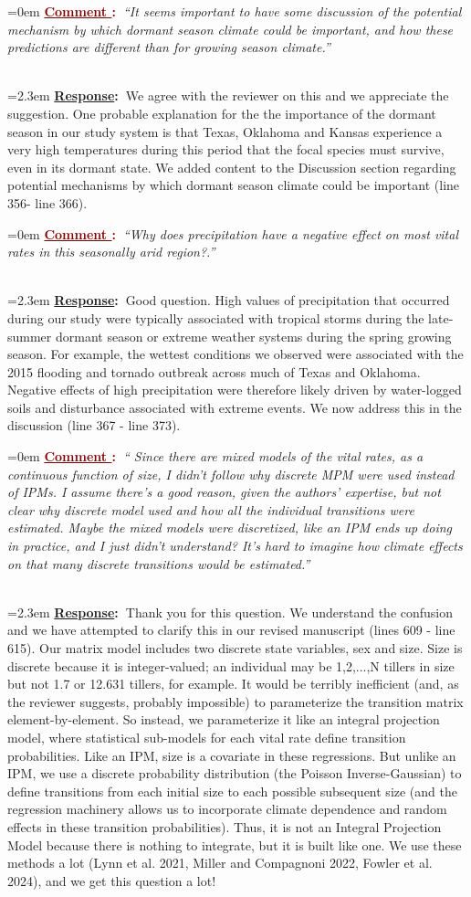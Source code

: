 \documentclass[12pt]{article}
\newcounter{cN}
\newcommand{\comment}[1]{
	\vspace{2em}
	\refstepcounter{cN} %
	\noindent \hangindent=0em \textbf{\textcolor{Maroon}{\uline{Comment \thecN}:~}}\emph{``#1''}
	}
\newcommand{\response}[1]{
	\\[0.25em]
	\hangindent=2.3em \textbf{\textcolor{NavyBlue}{\uline{Response}:~}}#1
	}
\begin{document}
\comment{It seems important to have some discussion of the potential mechanism by which dormant season climate could be important, and how these predictions are different than for growing season climate.}
\response{We agree with the reviewer on this and we appreciate the suggestion.  
One probable explanation for the the importance of the dormant season in our study system is that Texas, Oklahoma and Kansas experience a very high temperatures during this period that the focal species must survive, even in its dormant state.
We added content to the Discussion section regarding potential mechanisms by which dormant season climate could be important (line  356- line 366).}

\comment{Why does precipitation have a negative effect on most vital rates in this seasonally arid region?.}
\response{Good question. High values of precipitation that occurred during our study were typically associated with tropical storms during the late-summer dormant season or extreme weather systems during the spring growing season. 
For example, the wettest conditions we observed were associated with the 2015 flooding and tornado outbreak across much of Texas and Oklahoma. 
Negative effects of high precipitation were therefore likely driven by water-logged soils and disturbance associated with extreme events. 
We now address this in the discussion (line 367 - line 373).
}

\comment{ Since there are mixed models of the vital rates, as a continuous function of size, I didn’t follow why discrete MPM were used instead of IPMs. I assume there’s a good reason, given the authors’ expertise, but not clear why discrete model used and how all the individual transitions were estimated. Maybe the mixed models were discretized, like an IPM ends up doing in practice, and I just didn’t understand? It’s hard to imagine how climate effects on that many discrete transitions would be estimated.}
\response{Thank you for this question. We understand the confusion and we have attempted to clarify this in our revised manuscript (lines 609 - line 615).
Our matrix model includes two discrete state variables, sex and size. 
Size is discrete because it is integer-valued; an individual may be 1,2,...,N tillers in size but not 1.7 or 12.631 tillers, for example. 
It would be terribly inefficient (and, as the reviewer suggests, probably impossible) to parameterize the transition matrix element-by-element. 
So instead, we parameterize it like an integral projection model, where statistical sub-models for each vital rate define transition probabilities. 
Like an IPM, size is a covariate in these regressions. 
But unlike an IPM, we use a discrete probability distribution (the Poisson Inverse-Gaussian) to define transitions from each initial size to each possible subsequent size (and the regression machinery allows us to incorporate climate dependence and random effects in these transition probabilities). 
Thus, it is not an Integral Projection Model because there is nothing to integrate, but it is built like one. 
We use these methods a lot (Lynn et al. 2021, Miller and Compagnoni 2022, Fowler et al. 2024), and we get this question a lot!
}
\end{document}
